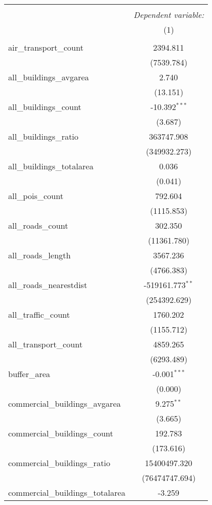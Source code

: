 \begin{table}[!htbp] \centering
\begin{tabular}{@{\extracolsep{5pt}}lc}
\\[-1.8ex]\hline
\hline \\[-1.8ex]
& \multicolumn{1}{c}{\textit{Dependent variable:}} \
\cr \cline{1-2}
\\[-1.8ex] & (1) \\
\hline \\[-1.8ex]
 air_transport_count & 2394.811$^{}$ \\
  & (7539.784) \\
 all_buildings_avgarea & 2.740$^{}$ \\
  & (13.151) \\
 all_buildings_count & -10.392$^{***}$ \\
  & (3.687) \\
 all_buildings_ratio & 363747.908$^{}$ \\
  & (349932.273) \\
 all_buildings_totalarea & 0.036$^{}$ \\
  & (0.041) \\
 all_pois_count & 792.604$^{}$ \\
  & (1115.853) \\
 all_roads_count & 302.350$^{}$ \\
  & (11361.780) \\
 all_roads_length & 3567.236$^{}$ \\
  & (4766.383) \\
 all_roads_nearestdist & -519161.773$^{**}$ \\
  & (254392.629) \\
 all_traffic_count & 1760.202$^{}$ \\
  & (1155.712) \\
 all_transport_count & 4859.265$^{}$ \\
  & (6293.489) \\
 buffer_area & -0.001$^{***}$ \\
  & (0.000) \\
 commercial_buildings_avgarea & 9.275$^{**}$ \\
  & (3.665) \\
 commercial_buildings_count & 192.783$^{}$ \\
  & (173.616) \\
 commercial_buildings_ratio & 15400497.320$^{}$ \\
  & (76474747.694) \\
 commercial_buildings_totalarea & -3.259$^{}$ \\

\end{tabular}
\end{table}
